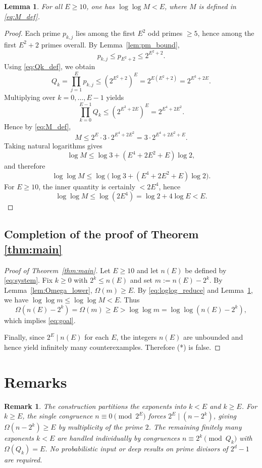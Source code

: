 \documentclass[11pt]{article}
\newtheorem{lemma}{Lemma}
\newtheorem{remark}{Remark}
\numberwithin{equation}{section}
\begin{document}
\begin{lemma}\label{lem:loglogM}
For all $E\ge 10$, one has $\log\log M<E$, where $M$ is defined in \eqref{eq:M_def}.
\end{lemma}

\begin{proof}
Each prime $p_{k,j}$ lies among the first $E^2$ odd primes $\ge 5$, hence among the first
$E^2+2$ primes overall. By Lemma~\ref{lem:pm_bound},
\[
p_{k,j}\le p_{E^2+2}\le 2^{E^2+2}.
\]
Using \eqref{eq:Qk_def}, we obtain
\[
Q_k=\prod_{j=1}^E p_{k,j}\le (2^{E^2+2})^E = 2^{E(E^2+2)}=2^{E^3+2E}.
\]
Multiplying over $k=0,\dots,E-1$ yields
\[
\prod_{k=0}^{E-1}Q_k \le (2^{E^3+2E})^{E}=2^{E^4+2E^2}.
\]
Hence by \eqref{eq:M_def},
\begin{equation}\label{eq:M_bound}
M \le 2^E\cdot 3\cdot 2^{E^4+2E^2}= 3\cdot 2^{E^4+2E^2+E}.
\end{equation}
Taking natural logarithms gives
\[
\log M \le \log 3 + (E^4+2E^2+E)\log 2,
\]
and therefore
\[
\log\log M \le \log\!\Big(\log 3 + (E^4+2E^2+E)\log 2\Big).
\]
For $E\ge 10$, the inner quantity is certainly $<2E^4$, hence
\[
\log\log M \le \log(2E^4)=\log 2 + 4\log E < E.
\]
\end{proof}

\subsection{Completion of the proof of Theorem \ref{thm:main}}

\begin{proof}[Proof of Theorem~\ref{thm:main}]
Let $E\ge 10$ and let $n(E)$ be defined by \eqref{eq:system}.
Fix $k\ge 0$ with $2^k\le n(E)$ and set $m:=n(E)-2^k$.
By Lemma~\ref{lem:Omega_lower}, $\Omega(m)\ge E$.
By \eqref{eq:loglog_reduce} and Lemma~\ref{lem:loglogM}, we have $\log\log m\le \log\log M<E$.
Thus
\[
\Omega(n(E)-2^k)=\Omega(m)\ge E > \log\log m=\log\log(n(E)-2^k),
\]
which implies \eqref{eq:goal}.

Finally, since $2^E\mid n(E)$ for each $E$, the integers $n(E)$ are unbounded and hence yield
infinitely many counterexamples. Therefore (*) is false.
\end{proof}

\section{Remarks}

\begin{remark}
The construction partitions the exponents into $k<E$ and $k\ge E$.
For $k\ge E$, the single congruence $n\equiv 0\pmod{2^E}$ forces $2^E\mid (n-2^k)$, giving
$\Omega(n-2^k)\ge E$ by multiplicity of the prime $2$.
The remaining finitely many exponents $k<E$ are handled individually by congruences
$n\equiv 2^k\pmod{Q_k}$ with $\Omega(Q_k)=E$.
No probabilistic input or deep results on prime divisors of $2^d-1$ are required.
\end{remark}
\end{document}
